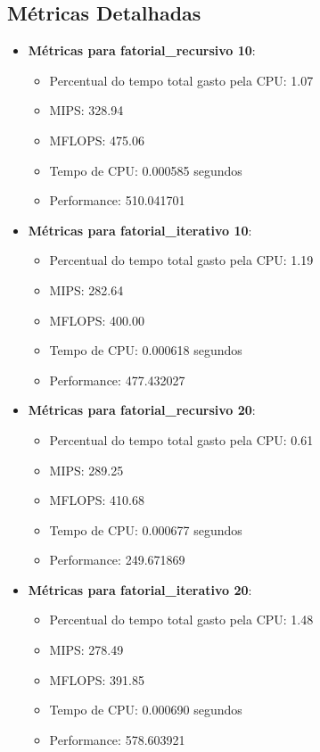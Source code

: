 \documentclass[12pt]{article}
\begin{document}
\subsection{Métricas Detalhadas}

\begin{itemize}
    \item \textbf{Métricas para fatorial\_recursivo 10}:
    \begin{itemize}
        \item Percentual do tempo total gasto pela CPU: 1.07
        \item MIPS: 328.94
        \item MFLOPS: 475.06
        \item Tempo de CPU: 0.000585 segundos
        \item Performance: 510.041701
    \end{itemize}

    \item \textbf{Métricas para fatorial\_iterativo 10}:
    \begin{itemize}
        \item Percentual do tempo total gasto pela CPU: 1.19
        \item MIPS: 282.64
        \item MFLOPS: 400.00
        \item Tempo de CPU: 0.000618 segundos
        \item Performance: 477.432027
    \end{itemize}

    \item \textbf{Métricas para fatorial\_recursivo 20}:
    \begin{itemize}
        \item Percentual do tempo total gasto pela CPU: 0.61
        \item MIPS: 289.25
        \item MFLOPS: 410.68
        \item Tempo de CPU: 0.000677 segundos
        \item Performance: 249.671869
    \end{itemize}

    \item \textbf{Métricas para fatorial\_iterativo 20}:
    \begin{itemize}
        \item Percentual do tempo total gasto pela CPU: 1.48
        \item MIPS: 278.49
        \item MFLOPS: 391.85
        \item Tempo de CPU: 0.000690 segundos
        \item Performance: 578.603921
    \end{itemize}


\end{itemize}
\end{document}
